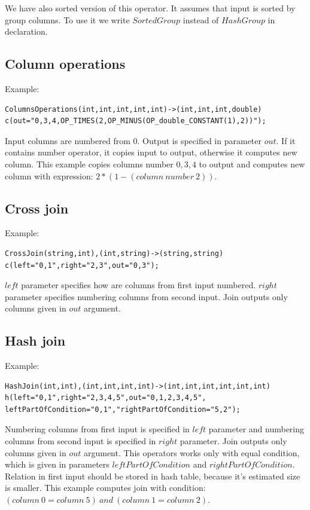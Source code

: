 We have also sorted version of this operator. It assumes that input is sorted by group columns. To use it we write $SortedGroup$ instead of $HashGroup$ in declaration.

\subsection{Column operations}
Example: 
\begin{lstlisting} 
ColumnsOperations(int,int,int,int,int)->(int,int,int,double)
c(out="0,3,4,OP_TIMES(2,OP_MINUS(OP_double_CONSTANT(1),2))"); 
\end{lstlisting}
Input columns are numbered from 0. Output is specified in parameter $out$. If it contains number operator, it copies input to output, otherwise it computes new column. 
This example copies columns number $0,3,4$ to output and computes new column with expression: $2*(1-(column~number~2))$.

\subsection{Cross join}
Example:
\begin{lstlisting} 
CrossJoin(string,int),(int,string)->(string,string)
c(left="0,1",right="2,3",out="0,3");
\end{lstlisting}
$left$ parameter specifies how are columns from first input numbered. $right$ parameter specifies numbering columns from second input. Join outputs only columns given in $out$ argument. 

\subsection{Hash join}
Example:
\begin{lstlisting}
HashJoin(int,int),(int,int,int,int)->(int,int,int,int,int,int)
h(left="0,1",right="2,3,4,5",out="0,1,2,3,4,5",
leftPartOfCondition="0,1","rightPartOfCondition="5,2"); 
\end{lstlisting}
Numbering columns from first input is specified in $left$ parameter and numbering columns from second input is specified in $right$ parameter. Join outputs only columns given in $out$ argument. This operators works only with equal condition, which is given in parameters $leftPartOfCondition$ and $rightPartOfCondition$. Relation in first input should be stored in hash table, because it's estimated size is smaller. This example computes join with condition:\\
 $(column~0=column~5)~and~(column~1=column~2)$.


